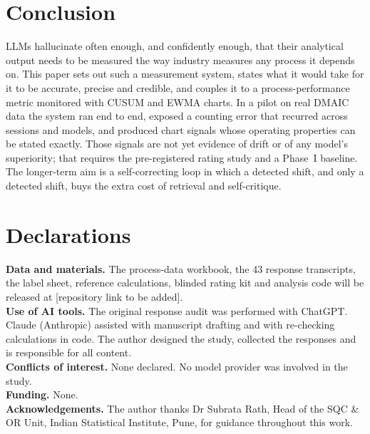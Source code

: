 \documentclass[11pt]{article}
\begin{document}
\section{Conclusion}
LLMs hallucinate often enough, and confidently enough, that their analytical output needs to be measured the way industry measures any process it depends on. This paper sets out such a measurement system, states what it would take for it to be accurate, precise and credible, and couples it to a process-performance metric monitored with CUSUM and EWMA charts. In a pilot on real DMAIC data the system ran end to end, exposed a counting error that recurred across sessions and models, and produced chart signals whose operating properties can be stated exactly. Those signals are not yet evidence of drift or of any model's superiority; that requires the pre-registered rating study and a Phase~I baseline. The longer-term aim is a self-correcting loop in which a detected shift, and only a detected shift, buys the extra cost of retrieval and self-critique.

\section*{Declarations}
\textbf{Data and materials.} The process-data workbook, the 43 response transcripts, the label sheet, reference calculations, blinded rating kit and analysis code will be released at [repository link to be added].\\
\textbf{Use of AI tools.} The original response audit was performed with ChatGPT. Claude (Anthropic) assisted with manuscript drafting and with re-checking calculations in code. The author designed the study, collected the responses and is responsible for all content.\\
\textbf{Conflicts of interest.} None declared. No model provider was involved in the study.\\
\textbf{Funding.} None.\\
\textbf{Acknowledgements.} The author thanks Dr Subrata Rath, Head of the SQC \& OR Unit, Indian Statistical Institute, Pune, for guidance throughout this work.
\end{document}
